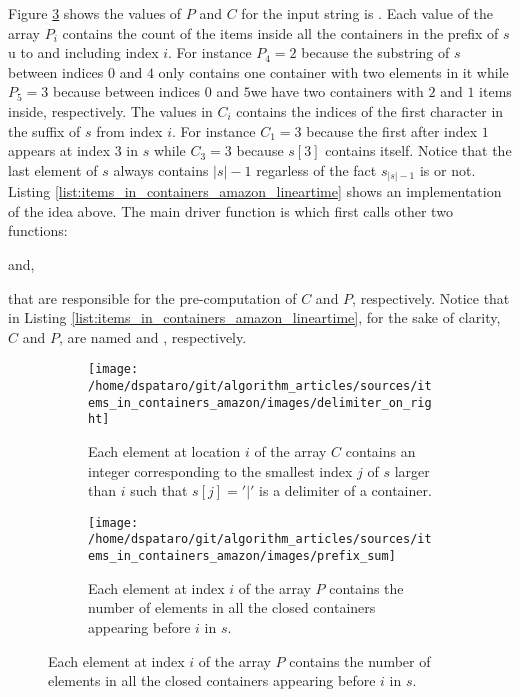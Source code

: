 Figure \ref{fig:items_in_containers_amazon:example_prefix} shows the values of $P$ and $C$ for the input string is .
Each value of the array $P_i$ contains the count of the items inside all the containers in the prefix of $s$ u to and including index $i$. 
For instance $P_4=2$ because the substring of $s$ between indices $0$ and $4$ only contains one container with two elements in it while $P_5=3$ because
between indices $0$ and $5$we have two containers with $2$ and $1$ items inside, respectively.
The values in $C_i$ contains the indices of the first character  in the suffix of $s$ from index $i$.
For instance $C_1=3$ because the first  after index $1$ appears at index $3$ in $s$ while
$C_3=3$ because $s[3]$ contains  itself.
Notice that the last element of $s$ always contains $|s|-1$ regarless of the fact $s_{|s|-1}$ is  or not. 
Listing \ref{list:items_in_containers_amazon_lineartime} shows an implementation of the idea above. 
The main driver function is  which first calls other two functions:
\begin{enumerate*}
	\item {} and,
	\item {}
\end{enumerate*}
that are responsible for the pre-computation of $C$ and $P$, respectively.
Notice that in Listing \ref{list:items_in_containers_amazon_lineartime}, 
for the sake of clarity, $C$ and $P$, are named  and , respectively.

\begin{figure}
	\centering
	\begin{subfigure}[t]{0.48\textwidth}
		\texttt{[image: /home/dspataro/git/algorithm\_articles/sources/items\_in\_containers\_amazon/images/delimiter\_on\_right]}
		\caption{Each element at location $i$ of the array $C$ contains an integer corresponding to the smallest index $j$ of $s$ larger than $i$ such that $s[j]='|'$ is a delimiter of a container.}
		\label{fig:items_in_containers_amazon:delimiter_right}
	 \end{subfigure}
	\hfill
	\begin{subfigure}[t]{0.48\textwidth}
		\texttt{[image: /home/dspataro/git/algorithm\_articles/sources/items\_in\_containers\_amazon/images/prefix\_sum]}
		\caption{Each element at index $i$ of the array $P$ contains the number of elements in all the closed containers appearing before $i$ in $s$.  }
		\label{fig:items_in_containers_amazon:prefix_sum}
	 \end{subfigure}
	 \label{fig:items_in_containers_amazon:example_prefix}
\end{figure}	 


